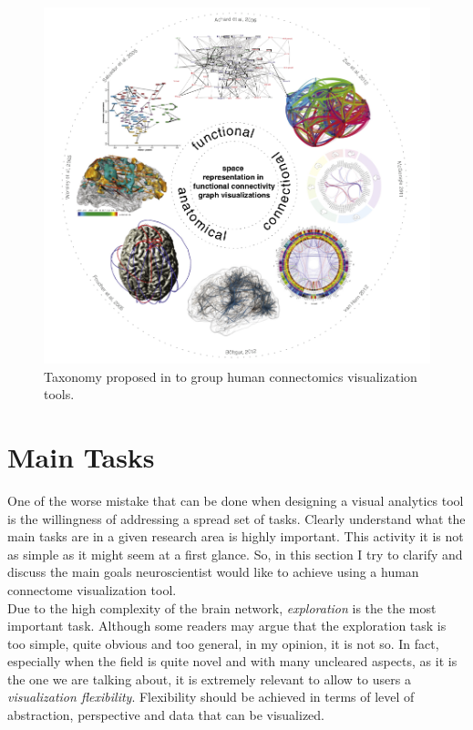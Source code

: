\documentclass{article}
\begin{document}
\begin{multicols}{2}
\begin{figure}[ht]
\centering
\includegraphics[width = 1.8\columnwidth]{taxonomy}
\caption{Taxonomy proposed in \cite{visualizingHumanConnectome} to group human connectomics visualization tools.}
\label{fig:taxonomy}
\end{figure}
\section{Main Tasks}
\label{sec:mainTasks}

One of the worse mistake that can be done when designing a visual analytics tool is the willingness of addressing a spread set of tasks. Clearly understand what the main tasks are in a given research area is highly important. This activity it is not as simple as it might seem at a first glance. So, in this section I try to clarify and discuss the main goals neuroscientist would like to achieve using a human connectome visualization tool.\\

Due to the high complexity of the brain network, \textit{exploration} is the the most important task. Although some readers may argue that the exploration task is too simple, quite obvious and too general, in my opinion, it is not so. In fact, especially when the field is quite novel and with many uncleared aspects, as it is the one we are talking about, it is extremely relevant to allow to users a \textit{visualization flexibility}. Flexibility should be achieved in terms of level of abstraction, perspective and data that can be visualized. \\



\end{multicols}
\end{document}
